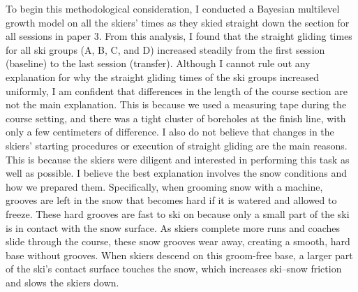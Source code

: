 To begin this methodological consideration, I conducted a Bayesian multilevel growth model on all the skiers' times as they skied straight down the section for all sessions in paper 3. From this analysis, I found that the straight gliding times for all ski groups (A, B, C, and D) increased steadily from the first session (baseline) to the last session (transfer). Although I cannot rule out any explanation for why the straight gliding times of the ski groups increased uniformly, I am confident that differences in the length of the course section are not the main explanation. This is because we used a measuring tape during the course setting, and there was a tight cluster of boreholes at the finish line, with only a few centimeters of difference. I also do not believe that changes in the skiers' starting procedures or execution of straight gliding are the main reasons. This is because the skiers were diligent and interested in performing this task as well as possible. I believe the best explanation involves the snow conditions and how we prepared them. Specifically, when grooming snow with a machine, grooves are left in the snow that becomes hard if it is watered and allowed to freeze. These hard grooves are fast to ski on because only a small part of the ski is in contact with the snow surface. As skiers complete more runs and coaches slide through the course, these snow grooves wear away, creating a smooth, hard base without grooves. When skiers descend on this groom-free base, a larger part of the ski’s contact surface touches the snow, which increases ski–snow friction and slows the skiers down.

